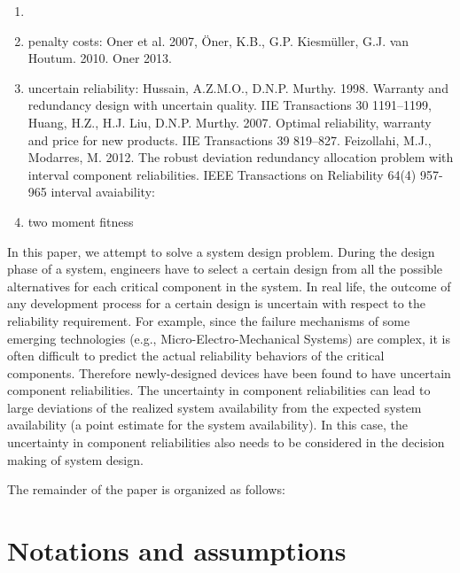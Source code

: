 \documentclass[preprint,12pt]{elsarticle}
\begin{document}
\begin{enumerate}
\item

\item penalty costs: Oner et al. 2007, Öner, K.B., G.P. Kiesmüller, G.J. van Houtum. 2010. Oner 2013.

\item uncertain reliability: Hussain, A.Z.M.O., D.N.P. Murthy. 1998. Warranty and redundancy design with uncertain quality. IIE Transactions 30 1191–1199,	Huang, H.Z., H.J. Liu, D.N.P. Murthy. 2007. Optimal reliability, warranty and price for new products. IIE Transactions 39 819–827.
 Feizollahi, M.J., Modarres, M.  2012. The robust deviation redundancy allocation problem with interval component reliabilities. IEEE Transactions on Reliability 64(4) 957-965
 interval avaiability:
\item two moment fitness
\end{enumerate}


In this paper, we attempt to solve a system design problem. During the design phase of a system, engineers have to select a certain design from all the possible alternatives for each critical component in the system. In real life, the outcome of any development process for a certain design is uncertain with respect to the reliability requirement. For example, since the failure mechanisms of some emerging technologies (e.g., Micro-Electro-Mechanical Systems) are complex, it is often difficult to predict the actual reliability behaviors of the critical components. Therefore newly-designed devices have been found to have uncertain component reliabilities. The uncertainty in component reliabilities can lead to large deviations of the realized system availability from the expected system availability (a point estimate for the system availability). In this case, the uncertainty in component reliabilities also needs to be considered in the decision making of system design.

The remainder of the paper is organized as follows:


\section{Notations and assumptions}
\end{document}
